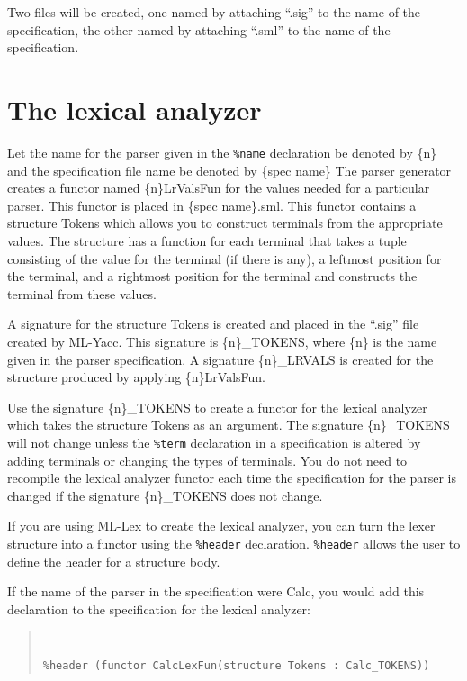 Two files will be created, one named by
attaching ``.sig'' to the name of the specification, the other named by
attaching ``.sml'' to the name of the specification.

\section{The lexical analyzer}

Let the name for
the parser given in the {\tt \%name} declaration be denoted by \{n\} and
the specification file name be denoted by \{spec name\}
The parser generator creates a functor named \{n\}LrValsFun for
the values needed for a particular parser.  This functor is placed
in \{spec name\}.sml.  This
functor contains a structure
Tokens which allows you to construct terminals from the appropriate
values.  The structure has a function for each terminal that takes a tuple
consisting of  the value for the terminal (if there is any), a leftmost
position for the terminal, and a rightmost position for the terminal and
constructs the terminal from these values.

A signature for the structure Tokens is created and placed in the ``.sig''
file created by ML-Yacc.  This signature is \{n\}\_TOKENS,
 where \{n\} is
the name given in the parser specification.  A signature
\{n\}\_LRVALS is created for the structure produced by
applying \{n\}LrValsFun.

Use the signature \{n\}\_TOKENS to create a functor for the
lexical analyzer which takes the structure Tokens as an argument.  The
signature \{n\}\_TOKENS
will not change unless the {\tt \%term} declaration in a
specification is altered by adding terminals or
changing the types of terminals.  You do not need to recompile
the lexical analyzer functor each time the specification for
the parser is changed if the
signature \{n\}\_TOKENS does not change.

If you are using ML-Lex to create the lexical analyzer, you
can turn the lexer structure into a functor using the
{\tt \%header} declaration.
{\tt \%header} allows the user to define the header for a structure body.

If the name of the parser in the specification were Calc, you
would add this declaration to the specification for the lexical 
analyzer:
\begin{quote}
\tt
\begin{verbatim}
%header (functor CalcLexFun(structure Tokens : Calc_TOKENS))
\end{verbatim}
\end{quote}

